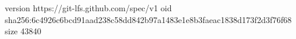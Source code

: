 version https://git-lfs.github.com/spec/v1
oid sha256:6c4926c6bcd91aad238c58dd842b97a1483e1e8b3faeac1838d173f2d3f76f68
size 43840
